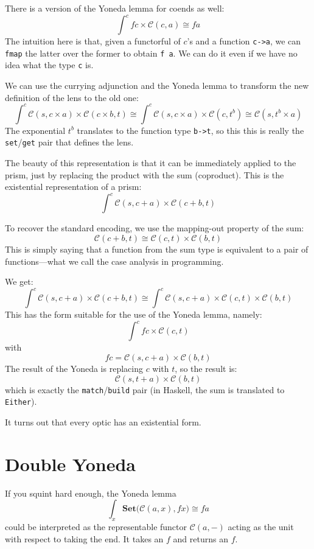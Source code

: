 \documentclass[11pt]{amsart}
\newcommand{\hask}[1]{\texttt{#1}}
\begin{document}
There is a version of the Yoneda lemma for coends as well:
\[ \int^c f c \times \mathcal{C}(c, a) \cong f a \]
The intuition here is that, given a functorful of $c$'s and a function \hask{c->a}, we can \hask{fmap} the latter over the former to obtain \hask{f a}. We can do it even if we have no idea what the type \hask{c} is.

We can use the currying adjunction and the Yoneda lemma to transform the new definition of the lens to the old one:
\[ \int^c \mathcal{C}(s, c \times a) \times \mathcal{C}(c \times b, t) \cong \int^c \mathcal{C}(s, c \times a) \times \mathcal{C}(c, t^b) \cong \mathcal{C}(s, t^b \times a)\]
The exponential $t^b$ translates to the function type \hask{b->t}, so this this is really the \hask{set}/\hask{get} pair that defines the lens.

The beauty of this representation is that it can be immediately applied to the prism, just by replacing the product with the sum (coproduct). This is the existential representation of a prism:
\[ \int^c \mathcal{C}(s, c + a) \times \mathcal{C}(c + b, t) \]

To recover the standard encoding, we use the mapping-out property of the sum:
\[  \mathcal{C}(c + b, t) \cong  \mathcal{C}(c, t)  \times  \mathcal{C}(b, t) \]
This is simply saying that a function from the sum type is equivalent to a pair of functions---what we call the case analysis in programming.

We get:
\[ \int^c \mathcal{C}(s, c + a) \times \mathcal{C}(c + b, t) \cong \int^c \mathcal{C}(s, c + a) \times \mathcal{C}(c, t)  \times \mathcal{C}(b, t)\]
This has the form suitable for the use of the Yoneda lemma, namely:
\[ \int^c f c \times \mathcal{C}(c, t) \]
with
\[ f c = \mathcal{C}(s, c + a) \times \mathcal{C}(b, t) \]
The result of the Yoneda is replacing $c$ with $t$, so the result is:
\[ \mathcal{C}(s, t + a) \times \mathcal{C}(b, t)\]
which is exactly the \hask{match}/\hask{build} pair (in Haskell, the sum is translated to \hask{Either}).

It turns out that every optic has an existential form.

\section{Double Yoneda}

If you squint hard enough, the Yoneda lemma 
\[ \int_{x} \mathbf{Set}\big(\mathcal{C}(a, x), f x\big) \cong f a \]
could be interpreted as the representable functor $\mathcal{C}(a, -)$ acting as the unit with respect to taking the end. It takes an $f$ and returns an $f$. 
\end{document}
